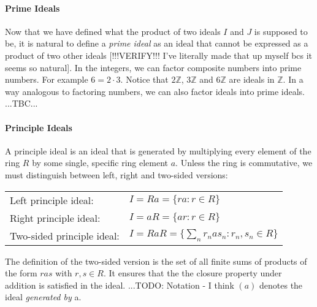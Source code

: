 \paragraph{Prime Ideals} Now that we have defined what the product of two ideals $I$ and $J$ is supposed to be, it is natural to define a \emph{prime ideal} as an ideal that cannot be expressed as a product of two other ideals [!!!VERIFY!!! I've literally made that up myself bcs it seems so natural].
In the integers, we can factor composite numbers into prime numbers. For example $6 = 2 \cdot 3$. Notice that $2 \mathbb{Z}$, $3 \mathbb{Z}$ and $6 \mathbb{Z}$ are ideals in $\mathbb{Z}$. In a way analogous to factoring numbers, we can also factor ideals into prime ideals. ...TBC...


%

\paragraph{Principle Ideals} A principle ideal is an ideal that is generated by multiplying every element of the ring $R$ by some single, specific ring element $a$. Unless the ring is commutative, we must distinguish between left, right and two-sided versions:

\medskip
\begin{tabular}{l l}
Left principle ideal:      & $I = R a = \{ r a : r \in R \}$ \\
Right principle ideal:     & $I = a R = \{ a r : r \in R \}$ \\
Two-sided principle ideal: & $I = RaR = \{ \sum_n r_n a s_n : r_n,s_n \in R \} $ \\
\end{tabular}
\medskip

The definition of the two-sided version is the set of all finite sums of products of the form $r a s$ with $r,s \in R$. It ensures that the the closure property under addition is satisfied in the ideal.%
...TODO: Notation - I think $(a)$ denotes the ideal \emph{generated by} a. 

